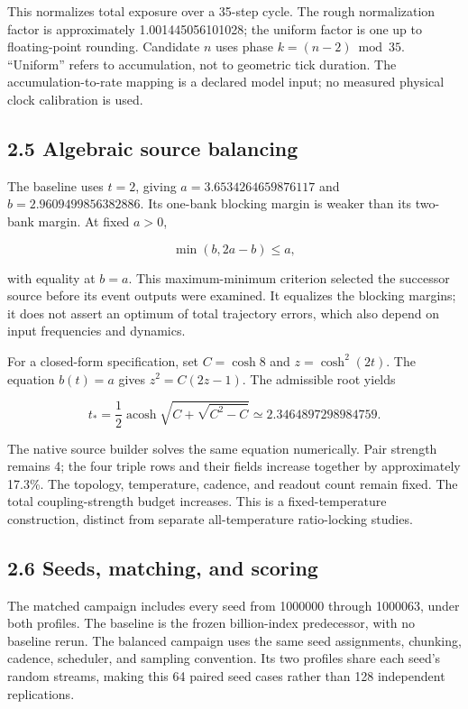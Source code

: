 \documentclass[
  11pt,
]{article}
\begin{document}
This normalizes total exposure over a 35-step cycle. The rough
normalization factor is approximately 1.001445056101028; the uniform
factor is one up to floating-point rounding. Candidate \(n\) uses phase
\(k=(n-2)\bmod35\). ``Uniform'' refers to accumulation, not to geometric
tick duration. The accumulation-to-rate mapping is a declared model
input; no measured physical clock calibration is used.

\subsection{2.5 Algebraic source
balancing}\label{algebraic-source-balancing}

The baseline uses \(t=2\), giving \(a=3.6534264659876117\) and
\(b=2.9609499856382886\). Its one-bank blocking margin is weaker than
its two-bank margin. At fixed \(a>0\),

\[
\min(b,2a-b)\le a, \tag{11}
\]

with equality at \(b=a\). This maximum-minimum criterion selected the
successor source before its event outputs were examined. It equalizes
the blocking margins; it does not assert an optimum of total trajectory
errors, which also depend on input frequencies and dynamics.

For a closed-form specification, set \(C=\cosh8\) and \(z=\cosh^2(2t)\).
The equation \(b(t)=a\) gives \(z^2=C(2z-1)\). The admissible root
yields

\[
t_* = \frac12\operatorname{acosh}\sqrt{C+\sqrt{C^2-C}}
\simeq2.3464897298984759. \tag{12}
\]

The native source builder solves the same equation numerically. Pair
strength remains 4; the four triple rows and their fields increase
together by approximately 17.3\%. The topology, temperature, cadence,
and readout count remain fixed. The total coupling-strength budget
increases. This is a fixed-temperature construction, distinct from
separate all-temperature ratio-locking studies.

\subsection{2.6 Seeds, matching, and
scoring}\label{seeds-matching-and-scoring}

The matched campaign includes every seed from 1000000 through 1000063,
under both profiles. The baseline is the frozen billion-index
predecessor, with no baseline rerun. The balanced campaign uses the same
seed assignments, chunking, cadence, scheduler, and sampling convention.
Its two profiles share each seed's random streams, making this 64 paired
seed cases rather than 128 independent replications.
\end{document}
